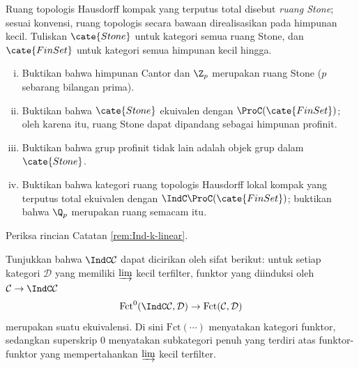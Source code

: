 \begin{Exercises}
	\item Ruang topologis Hausdorff kompak yang terputus total disebut \emph{ruang Stone}; sesuai konvensi, ruang topologis secara bawaan direalisasikan pada himpunan kecil. Tuliskan $\cate{Stone}$ untuk kategori semua ruang Stone, dan $\cate{FinSet}$ untuk kategori semua himpunan kecil hingga.
	\begin{enumerate}[(i)]
		\item Buktikan bahwa himpunan Cantor dan $\Z_p$ merupakan ruang Stone ($p$ sebarang bilangan prima).
		\item Buktikan bahwa $\cate{Stone}$ ekuivalen dengan $\ProC(\cate{FinSet})$; oleh karena itu, ruang Stone dapat dipandang sebagai himpunan profinit.
		\item Buktikan bahwa grup profinit tidak lain adalah objek grup dalam $\cate{Stone}$.
		\item Buktikan bahwa kategori ruang topologis Hausdorff lokal kompak yang terputus total ekuivalen dengan $\IndC\ProC(\cate{FinSet})$; buktikan bahwa $\Q_p$ merupakan ruang semacam itu.
	\end{enumerate}
	
	\item Periksa rincian Catatan \ref{rem:Ind-k-linear}.
	
	\item Tunjukkan bahwa $\IndC\mathcal{C}$ dapat dicirikan oleh sifat berikut: untuk setiap kategori $\mathcal{D}$ yang memiliki $\varinjlim$ kecil terfilter, funktor yang diinduksi oleh $\mathcal{C} \to \IndC\mathcal{C}$
	\[ \mathrm{Fct}^0(\IndC\mathcal{C}, \mathcal{D}) \to \mathrm{Fct}(\mathcal{C}, \mathcal{D}) \]
	merupakan suatu ekuivalensi. Di sini $\mathrm{Fct}(\cdots)$ menyatakan kategori funktor, sedangkan superskrip $0$ menyatakan subkategori penuh yang terdiri atas funktor-funktor yang mempertahankan $\varinjlim$ kecil terfilter.
\end{Exercises}
